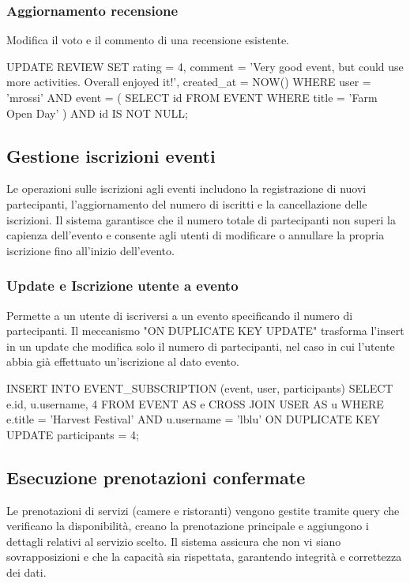 \documentclass[a4paper,12pt]{report}
\begin{document}
\subsubsection{Aggiornamento recensione}
Modifica il voto e il commento di una recensione esistente.

\begin{sqlcode}[caption={}]
UPDATE REVIEW
SET
  rating = 4,
  comment = 'Very good event, but could use more activities. Overall enjoyed it!',
  created_at = NOW()
WHERE
  user = 'mrossi'
    AND event = (
    SELECT id
    FROM EVENT
    WHERE title = 'Farm Open Day'
    )
  AND id IS NOT NULL;
\end{sqlcode}

\subsection{Gestione iscrizioni eventi}
Le operazioni sulle iscrizioni agli eventi includono la registrazione
di nuovi partecipanti, l'aggiornamento del numero di iscritti e la
cancellazione delle iscrizioni. Il sistema garantisce che il numero
totale di partecipanti non superi la capienza dell'evento e consente
agli utenti di modificare o annullare la propria iscrizione fino
all'inizio dell'evento.

\subsubsection{Update e Iscrizione utente a evento}
Permette a un utente di iscriversi a un evento specificando il numero
di partecipanti. Il meccanismo "ON DUPLICATE KEY UPDATE" trasforma
l'insert in un update che modifica solo il numero di partecipanti,
nel caso in cui l'utente abbia già effettuato un'iscrizione al dato evento.

\begin{sqlcode}[caption={}]
INSERT INTO EVENT_SUBSCRIPTION (event, user, participants)
SELECT
  e.id,
  u.username,
  4
FROM EVENT AS e
CROSS JOIN USER AS u
WHERE e.title = 'Harvest Festival' AND u.username = 'lblu'
ON DUPLICATE KEY UPDATE participants = 4;
\end{sqlcode}

\newpage
\subsection{Esecuzione prenotazioni confermate}
Le prenotazioni di servizi (camere e ristoranti) vengono gestite
tramite query che verificano la disponibilità, creano la prenotazione
principale e aggiungono i dettagli relativi al servizio scelto. Il
sistema assicura che non vi siano sovrapposizioni e che la capacità
sia rispettata, garantendo integrità e correttezza dei dati.
\end{document}

